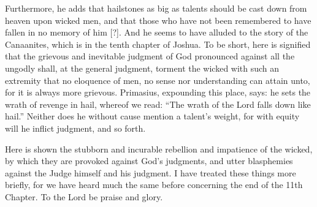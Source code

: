 Furthermore, he adds that hailstones as big as talents should be cast down from heaven upon wicked men, and that those who have not been remembered to have fallen in no memory of him [?]. And he seems to have alluded to the story of the Canaanites, which is in the tenth chapter of Joshua. To be short, here is signified that the grievous and inevitable judgment of God pronounced against all the ungodly shall, at the general judgment, torment the wicked with such an extremity that no eloquence of men, no sense nor understanding can attain unto, for it is always more grievous. Primasius, expounding this place, says: he sets the wrath of revenge in hail, whereof we read: “The wrath of the Lord falls down like hail.” Neither does he without cause mention a talent’s weight, for with equity will he inflict judgment, and so forth.

Here is shown the stubborn and incurable rebellion and impatience of the wicked, by which they are provoked against God’s judgments, and utter blasphemies against the Judge himself and his judgment. I have treated these things more briefly, for we have heard much the same before concerning the end of the 11th Chapter. To the Lord be praise and glory.
